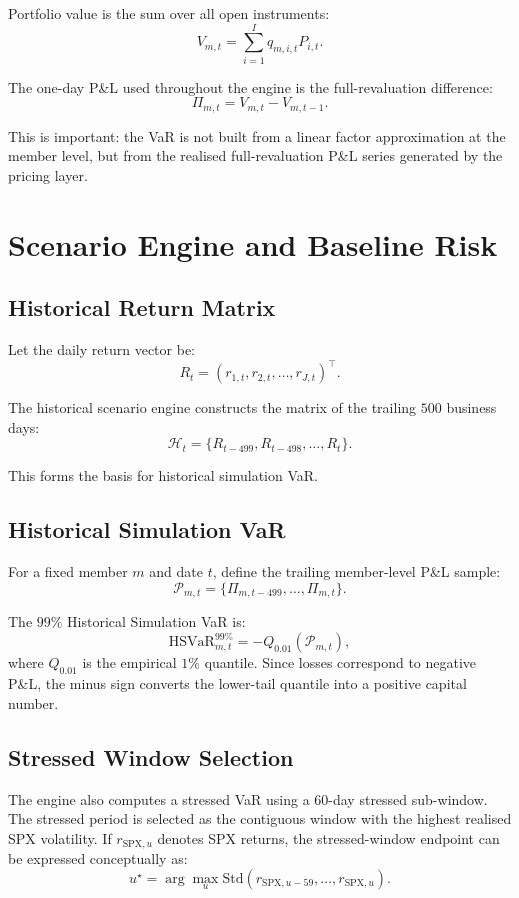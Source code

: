 \documentclass[11pt]{article}
\begin{document}
Portfolio value is the sum over all open instruments:
\[
V_{m,t} = \sum_{i=1}^{I} q_{m,i,t} P_{i,t}.
\]

The one-day P\&L used throughout the engine is the full-revaluation difference:
\[
\Pi_{m,t} = V_{m,t} - V_{m,t-1}.
\]

This is important: the VaR is not built from a linear factor approximation at the member level, but from the realised full-revaluation P\&L series generated by the pricing layer.

\section{Scenario Engine and Baseline Risk}

\subsection{Historical Return Matrix}

Let the daily return vector be:
\[
R_t = (r_{1,t}, r_{2,t}, \dots, r_{J,t})^{\top}.
\]

The historical scenario engine constructs the matrix of the trailing \(500\) business days:
\[
\mathcal{H}_t = \{R_{t-499}, R_{t-498}, \dots, R_t\}.
\]

This forms the basis for historical simulation VaR.

\subsection{Historical Simulation VaR}

For a fixed member \(m\) and date \(t\), define the trailing member-level P\&L sample:
\[
\mathcal{P}_{m,t} = \{\Pi_{m,t-499}, \dots, \Pi_{m,t}\}.
\]

The \(99\%\) Historical Simulation VaR is:
\[
\text{HSVaR}_{m,t}^{99\%}
=
-Q_{0.01}\left(\mathcal{P}_{m,t}\right),
\]
where \(Q_{0.01}\) is the empirical \(1\%\) quantile. Since losses correspond to negative P\&L, the minus sign converts the lower-tail quantile into a positive capital number.

\subsection{Stressed Window Selection}

The engine also computes a stressed VaR using a \(60\)-day stressed sub-window. The stressed period is selected as the contiguous window with the highest realised SPX volatility. If \(r_{\text{SPX},u}\) denotes SPX returns, the stressed-window endpoint can be expressed conceptually as:
\[
u^{\star}
=
\arg\max_{u}
\mathrm{Std}\left(
r_{\text{SPX},u-59}, \dots, r_{\text{SPX},u}
\right).
\]
\end{document}
